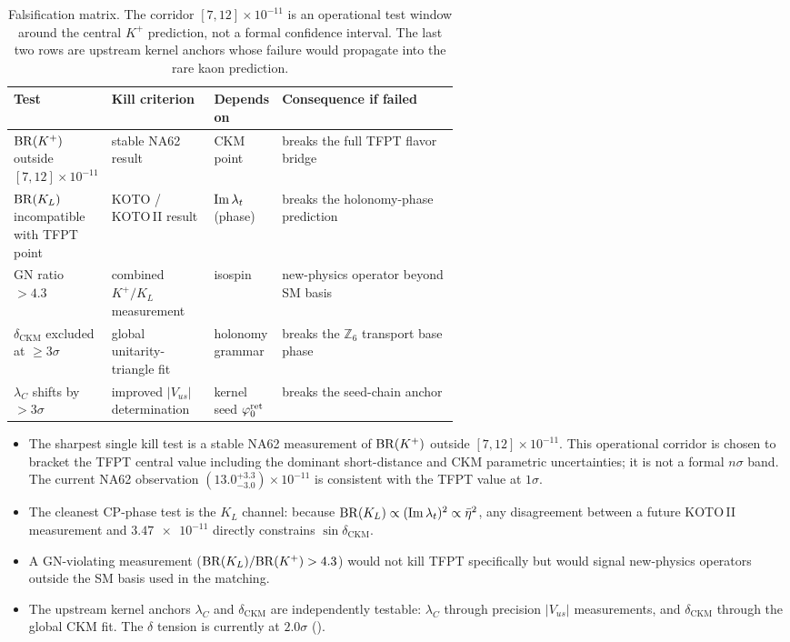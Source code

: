 \begin{table}[ht]
\centering
\small
\begin{tabularx}{\linewidth}{@{}>{\raggedright\arraybackslash}p{0.21\linewidth}>{\raggedright\arraybackslash}p{0.23\linewidth}>{\centering\arraybackslash}p{0.13\linewidth}>{\raggedright\arraybackslash}Y@{}}
\toprule
Test & Kill criterion & Depends on & Consequence if failed \\
\midrule
$\mathrm{BR}(K^+)$ outside $[7,12]\times 10^{-11}$
  & stable NA62 result
  & CKM point
  & breaks the full TFPT flavor bridge \\[4pt]
$\mathrm{BR}(K_L)$ incompatible with TFPT point
  & KOTO / KOTO\,II result
  & $\operatorname{Im}\lambda_t$ (phase)
  & breaks the holonomy-phase prediction \\[4pt]
GN ratio $>4.3$
  & combined $K^+/K_L$ measurement
  & isospin
  & new-physics operator beyond SM basis \\[4pt]
$\delta_{\mathrm{CKM}}$ excluded at ${\ge}3\sigma$
  & global unitarity-triangle fit
  & holonomy grammar
  & breaks the $\mathbb Z_6$ transport base phase \\[4pt]
$\lambda_C$ shifts by $>3\sigma$
  & improved $|V_{us}|$ determination
  & kernel seed $\varphi_{0}^{\mathrm{ret}}$
  & breaks the seed-chain anchor \\
\bottomrule
\end{tabularx}
\caption{Falsification matrix. The corridor $[7,12]\times10^{-11}$
is an operational test window around the central $K^+$ prediction,
not a formal confidence interval.
The last two rows are upstream kernel anchors whose failure would
propagate into the rare kaon prediction.}
\label{tab:falsification}
\end{table}

\begin{itemize}[leftmargin=1.6em, itemsep=0.3em]
\item The sharpest single kill test is a stable NA62 measurement of
$\mathrm{BR}(K^+)$ outside $[7,12]\times 10^{-11}$. This operational corridor
is chosen to bracket the TFPT central value including the dominant
short-distance and CKM parametric uncertainties; it is not a formal
$n\sigma$ band.
The current NA62 observation $(13.0^{+3.3}_{-3.0})\times 10^{-11}$
is consistent with the TFPT value at $1\sigma$.
\item The cleanest CP-phase test is the $K_L$ channel: because
$\mathrm{BR}(K_L)\propto(\operatorname{Im}\lambda_t)^2\propto\bar\eta^2$, any
disagreement between a future KOTO\,II measurement and
$\num{3.47e-11}$ directly constrains $\sin\delta_{\mathrm{CKM}}$.
\item A GN-violating measurement ($\mathrm{BR}(K_L)/\mathrm{BR}(K^+)>4.3$) would not
kill TFPT specifically but would signal new-physics operators outside
the SM basis used in the matching.
\item The upstream kernel anchors $\lambda_C$ and $\delta_{\mathrm{CKM}}$
are independently testable: $\lambda_C$ through precision $|V_{us}|$
measurements, and $\delta_{\mathrm{CKM}}$ through the global CKM fit.
The $\delta$ tension is currently at $2.0\sigma$ ().
\end{itemize}


